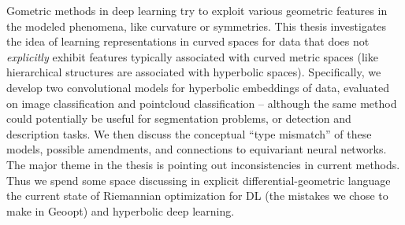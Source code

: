 Gometric methods in deep learning try to exploit various geometric features in
the modeled phenomena, like curvature or symmetries. This thesis investigates
the idea of learning representations in curved spaces for data that does not
\emph{explicitly} exhibit features typically associated with curved metric
spaces (like hierarchical structures are associated with hyperbolic spaces).
Specifically, we develop two convolutional models for hyperbolic embeddings of
data, evaluated on image classification and pointcloud classification --
although the same method could potentially be useful for segmentation problems,
or detection and description tasks.  We then discuss the conceptual ``type
mismatch'' of these models, possible amendments, and connections to equivariant
neural networks. The major theme in the thesis is pointing out inconsistencies
in current methods. Thus we spend some space discussing in explicit
differential-geometric language the current state of Riemannian optimization
for DL (the mistakes we chose to make in Geoopt) and hyperbolic deep learning.
